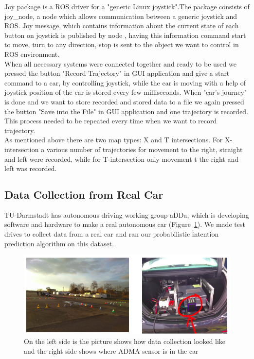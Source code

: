 Joy package is a \gls{ROS} driver for a "generic Linux joystick".The package consists of joy\_node, a node which allows communication between a generic joystick and \gls{ROS}. Joy message, which contains information about the current state of each button on joystick is published by node \cite{ROSjoy}, having this information command start to move, turn to any direction, stop is sent to the object we want to control in \gls{ROS} environment.  \\
When all necessary systems were connected together and ready to be used we pressed the button "Record Trajectory" in GUI application and give a start command to a car, by controlling joystick, while the car is moving with a help of joystick position of the car is stored every few milliseconds.  When "car's journey" is done and we want to store recorded and stored data to a file we again pressed the button "Save into the File" in GUI application and one trajectory is recorded. This process needed to be repeated every time when we want to record trajectory.\\
As mentioned above there are two map types: X and T intersections.  For X-intersection a various number of trajectories for movement to the right, straight and left were recorded, while for T-intersection only movement t the right and left was recorded.

\subsection{Data Collection from Real Car}

TU-Darmstadt has autonomous driving working group aDDa, which is developing software and hardware to make a real autonomous car (Figure~\ref{fig:ReadCAr}). We made test drives to collect data from a real car and ran our probabilistic intention prediction algorithm on this dataset. 

\begin{figure}[H]
	\centering  	
	\includegraphics[width=17cm]{img/realCar.png}
	\caption{On the left side is the picture shows how data collection looked like and the right side shows where \gls{ADMA} sensor is in the car}
	\label{fig:ReadCAr}    
\end{figure}

